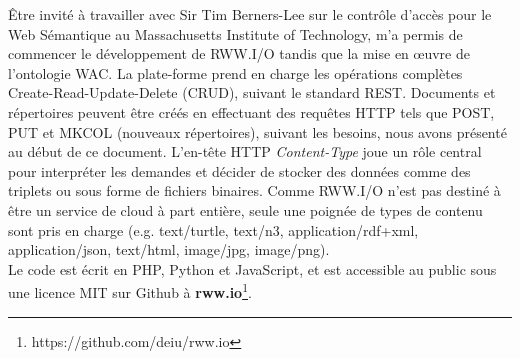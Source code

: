 \documentclass[a4paper]{article}
\begin{document}
Être invité à travailler avec Sir Tim Berners-Lee sur le contrôle d'accès pour le Web Sémantique au Massachusetts Institute of Technology, m'a permis de commencer le développement de RWW.I/O tandis que la mise en œuvre de l'ontologie WAC. La plate-forme prend en charge les opérations complètes Create-Read-Update-Delete (CRUD), suivant le standard REST. Documents et répertoires peuvent être créés en effectuant des requêtes HTTP tels que POST, PUT et MKCOL (nouveaux répertoires), suivant les besoins, nous avons présenté au début de ce document. L'en-tête HTTP \textit{Content-Type} joue un rôle central pour interpréter les demandes et décider de stocker des données comme des triplets ou sous forme de fichiers binaires. Comme RWW.I/O n'est pas destiné à être un service de cloud à part entière, seule une poignée de types de contenu sont pris en charge (e.g. text/turtle, text/n3, application/rdf+xml, application/json, text/html, image/jpg, image/png).\\


Le code est écrit en PHP, Python et JavaScript, et est accessible au public sous une licence MIT sur Github à \textbf{rww.io}\footnote{https://github.com/deiu/rww.io}.
\end{document}
